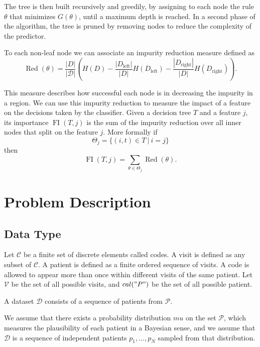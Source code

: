 \documentclass[]{marticle}
\newcommand{\ds}{\mathcal{D}}
\newcommand{\codes}{\mathcal{C}}
\newcommand{\patients}{\mathcal{P}}
\newcommand{\visits}{\mathcal{V}}
\DeclareMathOperator{\Red}{Red}
\DeclareMathOperator{\FI}{FI}
\begin{document}
The tree is then built recursively and greedily, by assigning to each node the rule $\theta$ that
minimizes $G(\theta)$, until a maximum depth is reached. In a second phase of the algorithm, the
tree is pruned by removing nodes to reduce the complexity of the predictor.

To each non-leaf node we can associate an impurity reduction measure defined as 
\begin{equation*}
    \Red(\theta) = \frac{|D|}{|\ds|} \left( H(D) - \frac{|D_\text{left}|}{|D|}H(D_\text{left})  -
    \frac{|D_\text{right}|}{|D|}H(D_\text{right}) \right).
\end{equation*}

This measure describes how successful each node is in decreasing the impurity in a region. We can
use this impurity reduction to measure the impact of a feature on the decisions taken by the
classifier. Given a decision tree $T$ and a feature $j$, its importance $\FI(T, j)$ is the sum of
the impurity reduction over all inner nodes that split on the feature $j$. More formally if 
\begin{equation*}
    \Theta_j = \{(i, t) \in T \ |\ i = j\}
\end{equation*}
then 
\begin{equation*}
    \FI(T, j) = \sum_{\theta \in \Theta_j} \Red(\theta).
\end{equation*}

\section{Problem Description}

\subsection{Data Type} \label{sect-datashape}

Let $\codes$ be a finite set of discrete elements called codes. A visit is defined as any subset
of $\codes$. A patient is defined as a finite ordered sequence of visits. A code is allowed to
appear more than once within different visits of the same patient. Let $\visits$ be the set of all
possible visits, and $cal("P")$ be the set of all possible patient.

A dataset $\ds$ consists of a sequence of patients from $\patients$.

We assume that there exists a probability distribution $mu$ on the set $\patients$, which measures
the plausibility of each patient in a Bayesian sense, and we assume that $\ds$ is a sequence of
independent patients $p_1, \dots, p_N$ sampled from that distribution.
\end{document}
